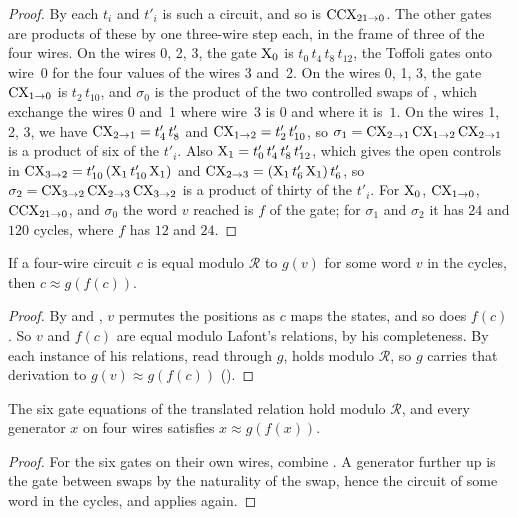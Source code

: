 \documentclass[acmsmall,screen,nonacm]{acmart}
\begin{document}
\begin{proof}
By  each $t_i$ and $t'_i$ is such a circuit, and so is $\mathrm{CCX}_{21\to0}$. The other gates are products of these by one three-wire step each, in the frame of three of the four wires. On the wires 0, 2, 3, the gate $\mathrm{X}_0$ is $t_0\,t_4\,t_8\,t_{12}$, the Toffoli gates onto wire~0 for the four values of the wires 3 and~2. On the wires 0, 1, 3, the gate $\mathrm{CX}_{1\to0}$ is $t_2\,t_{10}$, and $\sigma_0$ is the product of the two controlled swaps of , which exchange the wires 0 and~1 where wire~3 is $0$ and where it is~$1$. On the wires 1, 2, 3, we have $\mathrm{CX}_{2\to1}=t'_4\,t'_8$ and $\mathrm{CX}_{1\to2}=t'_2\,t'_{10}$, so $\sigma_1=\mathrm{CX}_{2\to1}\,\mathrm{CX}_{1\to2}\,\mathrm{CX}_{2\to1}$ is a product of six of the $t'_i$. Also $\mathrm{X}_1=t'_0\,t'_4\,t'_8\,t'_{12}$, which gives the open controls in $\mathrm{CX}_{3\to2}=t'_{10}\,(\mathrm{X}_1\,t'_{10}\,\mathrm{X}_1)$ and $\mathrm{CX}_{2\to3}=(\mathrm{X}_1\,t'_6\,\mathrm{X}_1)\,t'_6$, so $\sigma_2=\mathrm{CX}_{3\to2}\,\mathrm{CX}_{2\to3}\,\mathrm{CX}_{3\to2}$ is a product of thirty of the $t'_i$. For $\mathrm{X}_0$, $\mathrm{CX}_{1\to0}$, $\mathrm{CCX}_{21\to0}$, and $\sigma_0$ the word $v$ reached is $f$ of the gate; for $\sigma_1$ and $\sigma_2$ it has $24$ and $120$ cycles, where $f$ has $12$ and $24$.
\end{proof}

\begin{lemma}[\aid{to-f}]\label{lem:x-tof}
If a four-wire circuit $c$ is equal modulo $\mathcal{R}$ to $g(v)$ for some word $v$ in the cycles, then $c\approx g(f(c))$.
\end{lemma}

\begin{proof}
By  and , $v$ permutes the positions as $c$ maps the states, and so does $f(c)$. So $v$ and $f(c)$ are equal modulo Lafont's relations, by his completeness. By  each instance of his relations, read through $g$, holds modulo $\mathcal{R}$, so $g$ carries that derivation to $g(v)\approx g(f(c))$ \textup{()}.
\end{proof}

\begin{proposition}\label{prop:x-gates}
The six gate equations of the translated relation hold modulo $\mathcal{R}$, and every generator $x$ on four wires satisfies $x\approx g(f(x))$.
\end{proposition}

\begin{proof}
For the six gates on their own wires, combine . A generator further up is the gate between swaps by the naturality of the swap, hence the circuit of some word in the cycles, and  applies again.
\end{proof}
\end{document}
